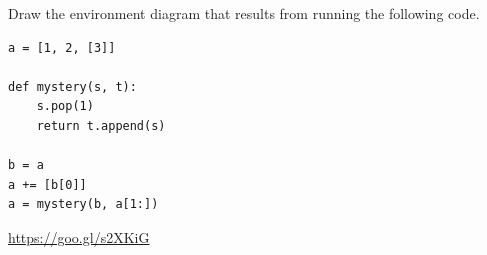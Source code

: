 \begin{blocksection}
\question Draw the environment diagram that results from running the following code.

\begin{lstlisting}
a = [1, 2, [3]]

def mystery(s, t):
    s.pop(1)
    return t.append(s)
    
b = a
a += [b[0]]
a = mystery(b, a[1:])
\end{lstlisting}

\begin{solution}[1in]
\url{https://goo.gl/s2XKiG}
\end{solution}
\end{blocksection}
